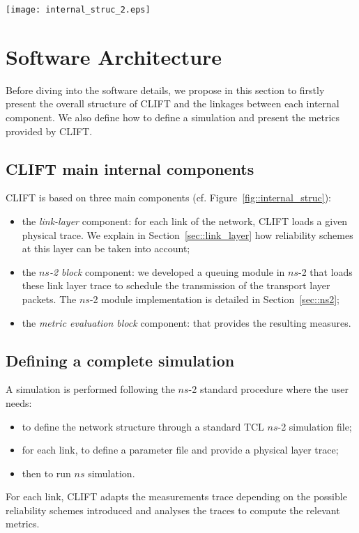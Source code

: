 \documentclass[conference,letterpaper]{IEEEtran}
\begin{document}
\begin{figure*}[!htb]
    \begin{center}
	\texttt{[image: internal\_struc\_2.eps]}
	\caption{Structure of software}
	\label{fig::internal_struc}
    \end{center}
\end{figure*}

\section{Software Architecture}
\label{sec::arch_soft}

Before diving into the software details, we propose in this section to firstly present the overall structure of CLIFT and the linkages between each internal component. We also define how to define a simulation and present the metrics provided by CLIFT. 

\subsection{CLIFT main internal components}
\label{sec::arch_soft_achievements}

CLIFT is based on three main components (cf. Figure~\ref{fig::internal_struc}): 

\begin{itemize}
\item the \textit{link-layer} component: for each link of the network, CLIFT loads a given physical trace. We explain in Section~\ref{sec::link_layer} how reliability schemes at this layer can be taken into account;
\item the \textit{$ns$-2 block} component: we developed a queuing module in $ns$-2 that loads these link layer trace to schedule the transmission of the transport layer packets. The $ns$-2 module implementation is detailed in Section~\ref{sec::ns2};
\item the \textit{metric evaluation block} component: that provides the resulting measures.
\end{itemize}

\subsection{Defining a complete simulation}
\label{subsec::arch_soft_complete_simu}
A simulation is performed following the $ns$-2 standard procedure where the user needs: 
\begin{itemize}
\item to define the network structure through a standard TCL $ns$-2 simulation file;
\item for each link, to define a parameter file and provide a physical layer trace;
\item then to run $ns$ simulation.
\end{itemize}
For each link, CLIFT adapts the measurements trace depending on the possible reliability schemes introduced and analyses the traces
to compute the relevant metrics.
\end{document}
